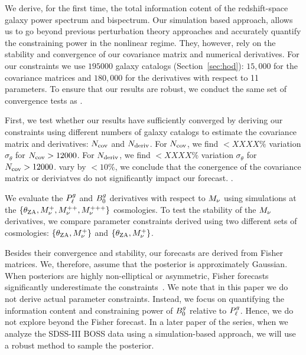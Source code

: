 We derive, for the first time, the total information cotent of the redshift-space 
galaxy power spectrum and bispectrum. Our simulation based approach, allows us
to go beyond previous perturbation theory approaches and accurately quantify the 
constraining power in the nonlinear regime. They, however, rely on the
stability and convergence of our covariance matrix and numerical derivatives.  
For our constraints we use $195000$ galaxy catalogs (Section~\ref{sec:hod}): 
$15,000$ for the covariance matrices and $180,000$ for the derivatives with 
respect to 11 parameters. To ensure that our results are robust, we conduct the
same set of convergence tests as \cite{hahn2020}. 

First, we test whether our results have sufficiently converged by deriving our 
constraints using different numbers of galaxy catalogs to estimate the covariance 
matrix and derivatives: $N_{\rm cov}$ and $N_{\rm deriv}$. For $N_{\rm cov}$,
we find $< XXXX\%$ variation $\sigma_\theta$ for $N_{\rm cov} > 12000$.
For $N_{\rm deriv}$, 
we find $< XXXX\%$ variation $\sigma_\theta$ for $N_{\rm cov} > 12000$.
vary by $< 10\%$, we conclude that the conergence of the covariance matrix or
deriviatves do not significantly impact our forecast. 
. 

We evaluate the $P^g_{\ell}$ and $B^g_0$ derivatives with respect to $M_\nu$ using
simulations at the $\{\theta_{\rm ZA}, M_\nu^+, M_\nu^{++}, M_\nu^{+++}\}$
cosmologies. To test the stability of the $M_\nu$ derivatives, we compare
parameter constraints derived using two different sets of cosmologies: 
$\{\theta_{\rm ZA}, M_\nu^+\}$ and $\{\theta_{\rm ZA}, M_\nu^+\}$. 

Besides their convergence and stability, our forecasts are derived from Fisher
matrices. We, therefore, assume that the posterior is approximately Gaussian. 
When posteriors are highly non-elliptical or asymmetric, Fisher forecasts 
significantly underestimate the constraints~\citep{wolz2012}. We note that in
this paper we do not derive actual parameter constraints. Instead, we focus on
quantifying the information content and constraining power of $B^g_0$ relative to
$P^g_{\ell}$. Hence, we do not explore beyond the Fisher forecast. In a later paper of 
the series, when we analyze the SDSS-III BOSS data using a simulation-based 
approach, we will use a robust method to sample the posterior.  

